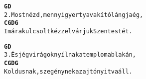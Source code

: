 \begin{minipage}{\textwidth}
\kottastart
{}
\kottaend
\begin{minipage}{\textwidth}
\begin{alltt}
\textbf{         G                                 D}
2. Most nézd, mennyi gyertya vakító lángja ég,
\textbf{     C             G      D               G}
   Imára kulcsolt kézzel várjuk Szentestét.
\end{alltt}
\vspace{0.0cm}
\versszakspacing
\end{minipage}
\begin{minipage}{\textwidth}
\begin{alltt}
\textbf{       G                                D}
3. És jégvirágok nyílnak a templom ablakán,
\textbf{       C          G         D           G}
   Koldusnak, szegénynek az ajtó nyitva áll.
\end{alltt}
\vspace{0.0cm}
\versszakspacing
\end{minipage}
\end{minipage}
~\vspace{1.0cm}
\newline
